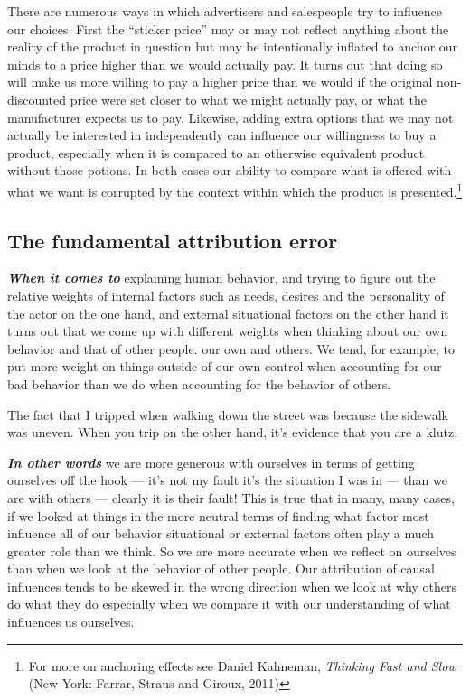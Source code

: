 \documentclass[
  12pt, openany]{book}
\theoremstyle{definition}
\theoremstyle{definition}
\theoremstyle{definition}
\theoremstyle{remark}
\begin{document}
There are numerous ways in which advertisers and salespeople try to influence our choices. First the ``sticker price'' may or may not reflect anything about the reality of the product in question but may be intentionally inflated to anchor our minds to a price higher than we would actually pay. It turns out that doing so will make us more willing to pay a higher price than we would if the original non-discounted price were set closer to what we might actually pay, or what the manufacturer expects us to pay. Likewise, adding extra options that we may not actually be interested in independently can influence our willingness to buy a product, especially when it is compared to an otherwise equivalent product without those potions. In both cases our ability to compare what is offered with what we want is corrupted by the context within which the product is presented.\footnote{For more on anchoring effects see Daniel Kahneman, \emph{Thinking Fast and Slow} (New York: Farrar, Straus and Giroux, 2011)}

\hypertarget{the-fundamental-attribution-error}{%
\subsection*{The fundamental attribution error}\label{the-fundamental-attribution-error}}


\textbf{\emph{When it comes to}} explaining human behavior, and trying to figure out the relative weights of internal factors such as needs, desires and the personality of the actor on the one hand, and external situational factors on the other hand it turns out that we come up with different weights when thinking about our own behavior and that of other people. our own and others. We tend, for example, to put more weight on things outside of our own control when accounting for our bad behavior than we do when accounting for the behavior of others.

\begin{center}

\begin{argument}

The fact that I tripped when walking down the street was because the sidewalk was uneven. When you trip on the other hand, it's evidence that you are a klutz.

\end{argument}

\end{center}

\textbf{\emph{In other words}} we are more generous with ourselves in terms of getting ourselves off the hook --- it's not my fault it's the situation I was in --- than we are with others --- clearly it is their fault! This is true that in many, many cases, if we looked at things in the more neutral terms of finding what factor most influence all of our behavior situational or external factors often play a much greater role than we think. So we are more accurate when we reflect on ourselves than when we look at the behavior of other people. Our attribution of causal influences tends to be skewed in the wrong direction when we look at why others do what they do especially when we compare it with our understanding of what influences us ourselves.
\end{document}
